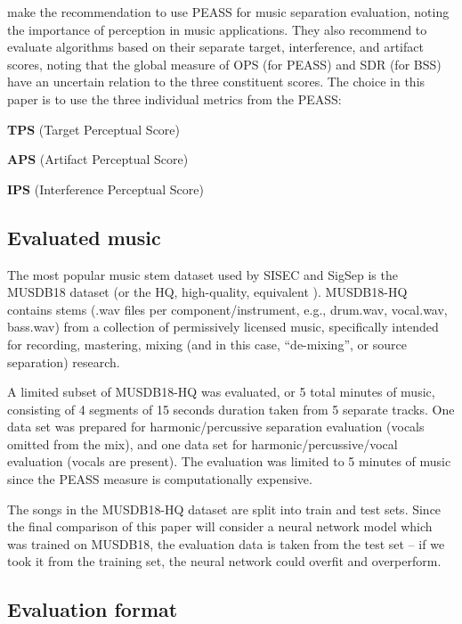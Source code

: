 \documentclass[letter,12pt]{article}
\newenvironment{tight_enumerate}{
\begin{enumerate}
  \setlength{\itemsep}{0pt}
  \setlength{\parskip}{0pt}
}{\end{enumerate}}
\begin{document}
\citet{beassvpeass} make the recommendation to use PEASS for music separation evaluation, noting the importance of perception in music applications. They also recommend to evaluate algorithms based on their separate target, interference, and artifact scores, noting that the global measure of OPS (for PEASS) and SDR (for BSS) have an uncertain relation to the three constituent scores. The choice in this paper is to use the three individual metrics from the PEASS:
\begin{tight_enumerate}
	\item
		\textbf{TPS} (Target Perceptual Score)
	\item
		\textbf{APS} (Artifact Perceptual Score)
	\item
		\textbf{IPS} (Interference Perceptual Score)
\end{tight_enumerate}

\subsection{Evaluated music}

The most popular music stem dataset used by SISEC and SigSep is the MUSDB18 dataset \cite{musdb18} (or the HQ, high-quality, equivalent \cite{musdb18-hq}). MUSDB18-HQ contains stems (.wav files per component/instrument, e.g., drum.wav, vocal.wav, bass.wav) from a collection of permissively licensed music, specifically intended for recording, mastering, mixing (and in this case, ``de-mixing'', or source separation) research. 

A limited subset of MUSDB18-HQ was evaluated, or 5 total minutes of music, consisting of 4 segments of 15 seconds duration taken from 5 separate tracks. One data set was prepared for harmonic/percussive separation evaluation (vocals omitted from the mix), and one data set for harmonic/percussive/vocal evaluation (vocals are present). The evaluation was limited to 5 minutes of music since the PEASS measure is computationally expensive.

The songs in the MUSDB18-HQ dataset are split into train and test sets. Since the final comparison of this paper will consider a neural network model which was trained on MUSDB18, the evaluation data is taken from the test set -- if we took it from the training set, the neural network could overfit and overperform.

\subsection{Evaluation format}
\end{document}
